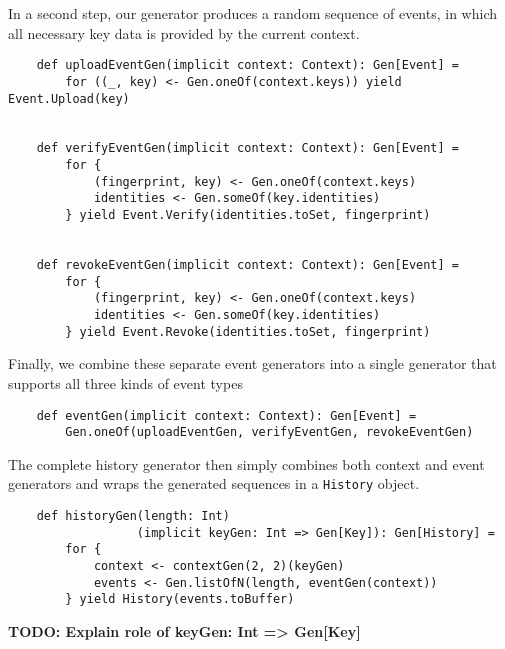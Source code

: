 In a second step, our generator produces a random sequence of events, in which all necessary key data is provided by the current context.

\begin{verbatim}
    def uploadEventGen(implicit context: Context): Gen[Event] =
        for ((_, key) <- Gen.oneOf(context.keys)) yield Event.Upload(key)


    def verifyEventGen(implicit context: Context): Gen[Event] =
        for {
            (fingerprint, key) <- Gen.oneOf(context.keys)
            identities <- Gen.someOf(key.identities)
        } yield Event.Verify(identities.toSet, fingerprint)


    def revokeEventGen(implicit context: Context): Gen[Event] =
        for {
            (fingerprint, key) <- Gen.oneOf(context.keys)
            identities <- Gen.someOf(key.identities)
        } yield Event.Revoke(identities.toSet, fingerprint)
\end{verbatim}

Finally, we combine these separate event generators into a single generator that supports all three kinds of event types

\begin{verbatim}
    def eventGen(implicit context: Context): Gen[Event] =
        Gen.oneOf(uploadEventGen, verifyEventGen, revokeEventGen)
\end{verbatim}

The complete history generator then simply combines both context and event generators and wraps the generated sequences in a \texttt{History} object.

\begin{verbatim}
    def historyGen(length: Int)
                  (implicit keyGen: Int => Gen[Key]): Gen[History] =
        for {
            context <- contextGen(2, 2)(keyGen)
            events <- Gen.listOfN(length, eventGen(context))
        } yield History(events.toBuffer)
\end{verbatim}

\textbf{TODO: Explain role of keyGen: Int => Gen[Key]}

